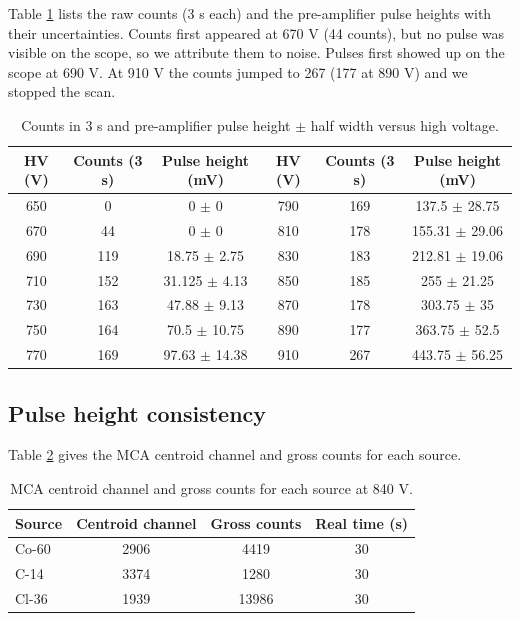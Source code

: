 \documentclass[12pt]{article}
\begin{document}
Table \ref{tab:rawcc} lists the raw counts (3 s each) and the pre-amplifier pulse heights with their uncertainties. Counts first appeared at 670 V (44 counts), but no pulse was visible on the scope, so we attribute them to noise. Pulses first showed up on the scope at 690 V. At 910 V the counts jumped to 267 (177 at 890 V) and we stopped the scan.

\begin{table}[!htbp]
\centering\small\setlength{\tabcolsep}{3pt}
\begin{tabular}{ccc|ccc}
\toprule
\textbf{HV (V)} & \textbf{Counts (3 s)} & \textbf{Pulse height (mV)} & \textbf{HV (V)} & \textbf{Counts (3 s)} & \textbf{Pulse height (mV)} \\
\midrule
650 & 0 & 0 $\pm$ 0 & 790 & 169 & 137.5 $\pm$ 28.75 \\
670 & 44 & 0 $\pm$ 0 & 810 & 178 & 155.31 $\pm$ 29.06 \\
690 & 119 & 18.75 $\pm$ 2.75 & 830 & 183 & 212.81 $\pm$ 19.06 \\
710 & 152 & 31.125 $\pm$ 4.13 & 850 & 185 & 255 $\pm$ 21.25 \\
730 & 163 & 47.88 $\pm$ 9.13 & 870 & 178 & 303.75 $\pm$ 35 \\
750 & 164 & 70.5 $\pm$ 10.75 & 890 & 177 & 363.75 $\pm$ 52.5 \\
770 & 169 & 97.63 $\pm$ 14.38 & 910 & 267 & 443.75 $\pm$ 56.25 \\
\bottomrule
\end{tabular}
\caption{Counts in 3 s and pre-amplifier pulse height $\pm$ half width versus high voltage.}
\label{tab:rawcc}
\end{table}

\subsection{Pulse height consistency}

Table \ref{tab:rawcons} gives the MCA centroid channel and gross counts for each source.

\begin{table}[!htbp]
\centering\small
\begin{tabular}{lccc}
\toprule
\textbf{Source} & \textbf{Centroid channel} & \textbf{Gross counts} & \textbf{Real time (s)} \\
\midrule
Co-60 & 2906 & 4419 & 30 \\
C-14 & 3374 & 1280 & 30 \\
Cl-36 & 1939 & 13986 & 30 \\
\bottomrule
\end{tabular}
\caption{MCA centroid channel and gross counts for each source at 840 V.}
\label{tab:rawcons}
\end{table}
\end{document}
